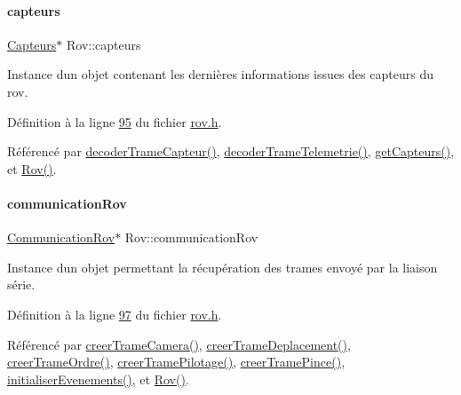 \mbox{\label{class_rov_a1b34d63d505da660be27b75ad93754c3}} 
\paragraph{\texorpdfstring{capteurs}{capteurs}}
{\footnotesize\ttfamily \hyperlink{class_capteurs}{Capteurs}$\ast$ Rov\+::capteurs\hspace{0.3cm}{\ttfamily [private]}}



Instance d\textquotesingle{}un objet contenant les dernières informations issues des capteurs du rov. 



Définition à la ligne \hyperlink{rov_8h_source_l00095}{95} du fichier \hyperlink{rov_8h_source}{rov.\+h}.



Référencé par \hyperlink{rov_8cpp_source_l00086}{decoder\+Trame\+Capteur()}, \hyperlink{rov_8cpp_source_l00081}{decoder\+Trame\+Telemetrie()}, \hyperlink{rov_8cpp_source_l00149}{get\+Capteurs()}, et \hyperlink{rov_8cpp_source_l00011}{Rov()}.

\mbox{\label{class_rov_a8e7aaa17ee2134f26d57241d11ab2a99}} 
\paragraph{\texorpdfstring{communication\+Rov}{communicationRov}}
{\footnotesize\ttfamily \hyperlink{class_communication_rov}{Communication\+Rov}$\ast$ Rov\+::communication\+Rov\hspace{0.3cm}{\ttfamily [private]}}



Instance d\textquotesingle{}un objet permettant la récupération des trames envoyé par la liaison série. 



Définition à la ligne \hyperlink{rov_8h_source_l00097}{97} du fichier \hyperlink{rov_8h_source}{rov.\+h}.



Référencé par \hyperlink{rov_8cpp_source_l00251}{creer\+Trame\+Camera()}, \hyperlink{rov_8cpp_source_l00208}{creer\+Trame\+Deplacement()}, \hyperlink{rov_8cpp_source_l00230}{creer\+Trame\+Ordre()}, \hyperlink{rov_8cpp_source_l00219}{creer\+Trame\+Pilotage()}, \hyperlink{rov_8cpp_source_l00240}{creer\+Trame\+Pince()}, \hyperlink{rov_8cpp_source_l00112}{initialiser\+Evenements()}, et \hyperlink{rov_8cpp_source_l00011}{Rov()}.

